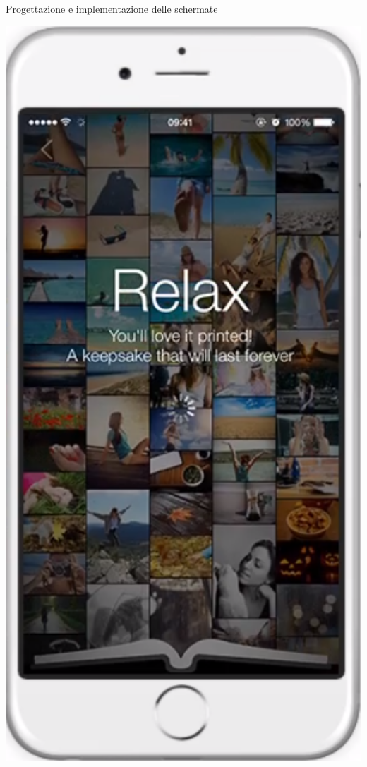 \begin{frame}{Progettazione e implementazione delle schermate}
\begin{minipage}{0.49\textwidth}
\begin{minipage}{0.32\textwidth}
				\end{minipage}
				\begin{minipage}{0.32\textwidth}
					\includegraphics[width=1.0\textwidth]{capitolo_3/immagini/schermata_di_intrattenimento.png}

\end{minipage}
\end{minipage}
\end{frame}
